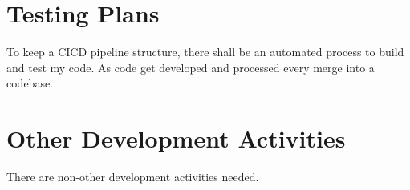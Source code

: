\section{Testing Plans}
\label{loc:SDP_TestingPlans}
% 

To keep a CICD pipeline structure, there shall be an automated process to build and test my code. As code get developed and processed every merge into a codebase.


\section{Other Development Activities}
\label{loc:SDP_OtherDevelopmentActivities}
% 

There are non-other development activities needed.